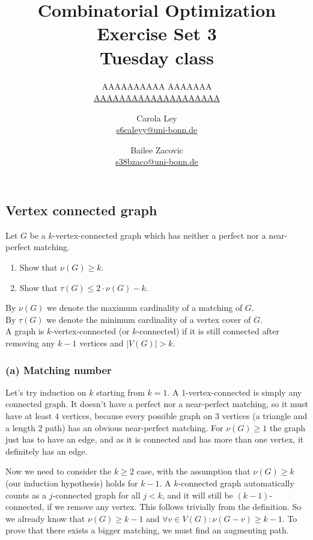 \documentclass{article}
\title{Combinatorial Optimization \\ Exercise Set 3 \\ Tuesday class}
\author{
  AAAAAAAAAA AAAAAAA \\
  \href{mailto:AAAAAAAAAAAAAAAAAAAA}{AAAAAAAAAAAAAAAAAAAA}
  \and
  Carola Ley \\
  \href{mailto:s6caleyy@uni-bonn.de}{s6caleyy@uni-bonn.de}
  \and
  Bailee Zacovic \\
  \href{mailto:s38bzaco@uni-bonn.de}{s38bzaco@uni-bonn.de}
}
\begin{document}
  \maketitle

  \setcounter{section}{3}
  \subsection{Vertex connected graph}
  \begin{centerframebox}
    Let $G$ be a $k$-vertex-connected graph which has neither a perfect nor a near-perfect matching.

    \begin{enumerate}[label=(\alph*)]
      \item Show that $\nu(G) \geq k$.
      \item Show that $\tau(G) \leq 2 \cdot \nu(G) - k$.
    \end{enumerate}

    By $\nu(G)$ we denote the maximum cardinality of a matching of $G$. \\
    By $\tau(G)$ we denote the minimum cardinality of a vertex cover of $G$. \\
    A graph is $k$-vertex-connected (or $k$-connected) if it is still connected after removing any $k-1$ vertices and $|V(G)| > k$.
  \end{centerframebox}
  \subsubsection*{(a) Matching number}
  Let's try induction on $k$ starting from $k=1$.
  A $1$-vertex-connected is simply any connected graph.
  It doesn't have a perfect nor a near-perfect matching, so it must have at least $4$ vertices,
  because every possible graph on $3$ vertices (a triangle and a length $2$ path) has an obvious near-perfect matching.
  For $\nu(G) \geq 1$ the graph just has to have an edge, and as it is connected and has more than one vertex, it definitely has an edge.

  Now we need to consider the $k \geq 2$ case, with the assumption that $\nu(G) \geq k$ (our induction hypothesis) holds for $k-1$.
  A $k$-connected graph automatically counts as a $j$-connected graph for all $j < k$,
  and it will still be $(k-1)$-connected, if we remove any vertex.
  This follows trivially from the definition.
  So we already know that $\nu(G) \geq k-1$ and $\forall v \in V(G) : \nu(G - v) \geq k-1$.
  To prove that there exists a bigger matching, we must find an augmenting path.
\end{document}
